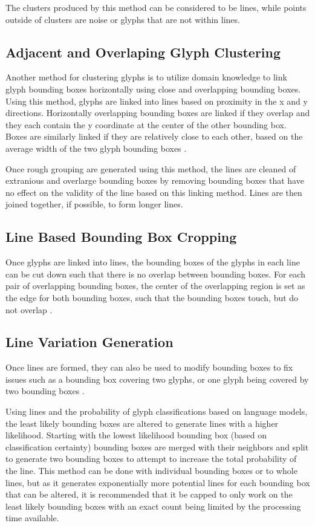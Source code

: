 The clusters produced by this method can be considered to be lines, while points outside of clusters are noise or glyphs that are not within lines.

\subsection{Adjacent and Overlaping Glyph Clustering}

Another method for clustering glyphs is to utilize domain knowledge to link glyph bounding boxes horizontally using close and overlapping bounding boxes. Using this method, glyphs are linked into lines based on proximity in the x and y directions. Horizontally overlapping bounding boxes are linked if they overlap and they each contain the y coordinate at the center of the other bounding box. Boxes are similarly linked if they are relatively close to each other, based on the average width of the two glyph bounding boxes .

Once rough grouping are generated using this method, the lines are cleaned of extranious and overlarge bounding boxes by removing bounding boxes that have no effect on the validity of the line based on this linking method. Lines are then joined together, if possible, to form longer lines.

\subsection{Line Based Bounding Box Cropping}

Once glyphs are linked into lines, the bounding boxes of the glyphs in each line can be cut down such that there is no overlap between bounding boxes. For each pair of overlapping bounding boxes, the center of the overlapping region is set as the edge for both bounding boxes, such that the bounding boxes touch, but do not overlap .

\subsection{Line Variation Generation}

Once lines are formed, they can also be used to modify bounding boxes to fix issues such as a bounding box covering two glyphs, or one glyph being covered by two bounding boxes .

Using lines and the probability of glyph classifications based on language models, the least likely bounding boxes are altered to generate lines with a higher likelihood. Starting with the lowest likelihood bounding box (based on classification certainty) bounding boxes are merged with their neighbors and split to generate two bounding boxes to attempt to increase the total probability of the line. This method can be done with individual bounding boxes or to whole lines, but as it generates exponentially more potential lines for each bounding box that can be altered, it is recommended that it be capped to only work on the least likely bounding boxes with an exact count being limited by the processing time available.


